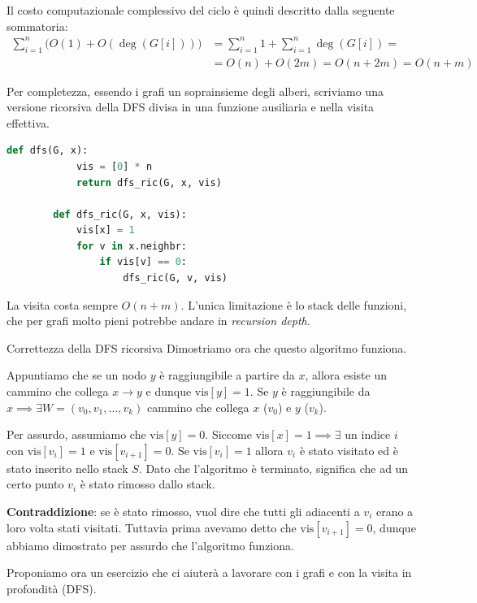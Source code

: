 \documentclass[12pt]{report}
\begin{document}
	Il costo computazionale complessivo del ciclo è quindi descritto dalla seguente sommatoria:
	\begin{align*}
		\sum_{i=1}^n \Big( O(1) + O(\operatorname{deg}(G[i])) \Big)
		&= \sum_{i=1}^n 1 + \sum_{i=1}^n \operatorname{deg}(G[i]) = \\
		&= O(n) + O(2m) = O(n + 2m) = O(n + m)
	\end{align*}
	
	Per completezza, essendo i grafi un soprainsieme degli alberi, scriviamo una versione ricorsiva della DFS divisa in una funzione ausiliaria e nella visita effettiva.
	
	\begin{lstlisting}[language=Python]
		def dfs(G, x):
			vis = [0] * n
			return dfs_ric(G, x, vis)
			
		def dfs_ric(G, x, vis):
			vis[x] = 1
			for v in x.neighbr:
				if vis[v] == 0:
					dfs_ric(G, v, vis)
	\end{lstlisting}
	
	La visita costa sempre $O(n+m)$. L'unica limitazione è lo stack delle funzioni, che per grafi molto pieni potrebbe andare in \textit{recursion depth}.
	
	\begin{dimostrazione}{Correttezza della DFS ricorsiva}{}
		Dimostriamo ora che questo algoritmo funziona.
		
		Appuntiamo che se un nodo $y$ è raggiungibile a partire da $x$, allora esiste un cammino che collega $x \to y$ e dunque $\text{vis}[y] = 1$.
		Se $y$ è raggiungibile da $x \implies \exists W = (v_0, v_1, \dots, v_k)$ cammino che collega $x$ ($v_0$) e $y$ ($v_k$).
		
		Per assurdo, assumiamo che $\text{vis}[y] = 0$.
		Siccome $\text{vis}[x] = 1 \implies \exists$ un indice $i$ con $\text{vis}[v_i] = 1$ e $\text{vis}[v_{i+1}] = 0$.
		Se $\text{vis}[v_i] = 1$ allora $v_i$ è stato visitato ed è stato inserito nello stack $S$.
		Dato che l'algoritmo è terminato, significa che ad un certo punto $v_i$ è stato rimosso dallo stack.
		
		\textbf{Contraddizione}: se è stato rimosso, vuol dire che tutti gli adiacenti a $v_i$ erano a loro volta stati visitati. Tuttavia prima avevamo detto che $\text{vis}[v_{i+1}] = 0$, dunque abbiamo dimostrato per assurdo che l'algoritmo funziona.
	\end{dimostrazione}
	
	Proponiamo ora un esercizio che ci aiuterà a lavorare con i grafi e con la visita in profondità (DFS).
	
\end{document}
